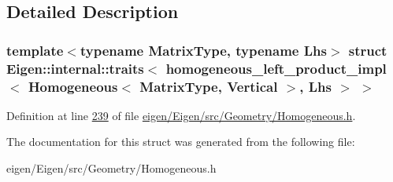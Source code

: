 \subsection{Detailed Description}
\subsubsection*{template$<$typename Matrix\+Type, typename Lhs$>$\newline
struct Eigen\+::internal\+::traits$<$ homogeneous\+\_\+left\+\_\+product\+\_\+impl$<$ Homogeneous$<$ Matrix\+Type, Vertical $>$, Lhs $>$ $>$}



Definition at line \hyperlink{eigen_2_eigen_2src_2_geometry_2_homogeneous_8h_source_l00239}{239} of file \hyperlink{eigen_2_eigen_2src_2_geometry_2_homogeneous_8h_source}{eigen/\+Eigen/src/\+Geometry/\+Homogeneous.\+h}.



The documentation for this struct was generated from the following file\+:\begin{DoxyCompactItemize}
\item 
eigen/\+Eigen/src/\+Geometry/\+Homogeneous.\+h\end{DoxyCompactItemize}
